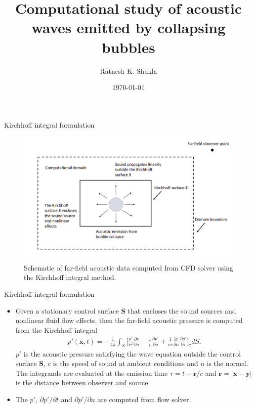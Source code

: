 \documentclass[10pt, aspectratio=169]{beamer}
\title{Computational study of acoustic waves emitted by collapsing bubbles}
\date{\today}
\author[shortname]{Ratnesh K. Shukla}
\institute[shortinst]{Indian Institute of Science, Bangalore}
\begin{document}
\begin{frame}
	\maketitle
\end{frame}

\begin{frame}{Kirchhoff integral formulation}
	\begin{figure}
		\centering
		\includegraphics[scale=0.23]{images/shematic.png}
		\caption{Schematic of far-field acoustic data computed from CFD solver using the Kirchhoff integral method.}
	\end{figure}
\end{frame}

\begin{frame}{Kirchhoff integral formulation}
	\begin{itemize}
		\item Given a stationary control surface \textbf{S} that encloses the sound sources and nonlinear fluid flow effects, then the far-field acoustic pressure is computed from the Kirchhoff integral 
		\begin{equation}
			\begin{split}
				p'(\mathbf{x}, t) = -\frac{1}{4\pi}\int_{S}\Big[  \frac{p'}{r^{2}}\frac{\partial r}{\partial n} - \frac{1}{r}\frac{\partial p'}{\partial n} + \frac{1}{c r}\frac{\partial r}{\partial n}\frac{\partial p'}{\partial \tau} \Big]_{\tau} dS.
			\end{split} 
		\end{equation}
		$p'$ is the acoustic pressure satisfying the wave equation outside the control surface \textbf{S}, $c$ is the speed of sound at ambient conditions and $n$ is the normal.
		The integrands are evaluated at the emission time $\tau = t - \mathbf{r}/c$ and $\mathbf{r}= |\mathbf{x} - \mathbf{y}|$ is the distance between observer and source.
		\item The $p'$, ${\partial p'}/{\partial t}$ and ${\partial p'}/{\partial n}$ are computed from flow solver.
	\end{itemize}
\end{frame}
\end{document}
